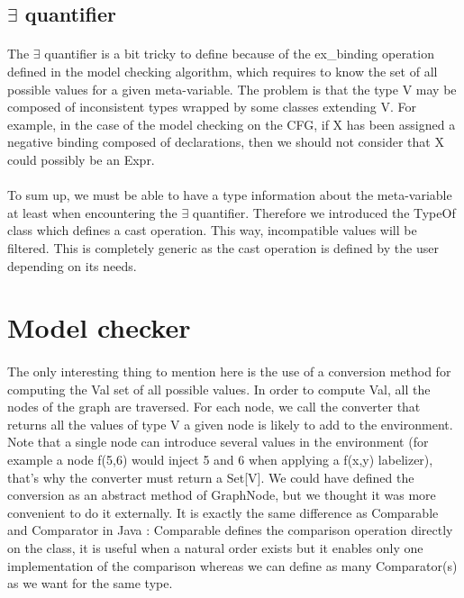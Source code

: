 \documentclass{report}
\begin{document}
\subsection{$\exists$ quantifier}

\paragraph{}
\hspace{4mm}The $\exists$ quantifier is a bit tricky to define because of the ex\_binding operation defined in the model checking algorithm, which requires
to know the set of all possible values for a given meta-variable. The problem is that the type V may be composed of inconsistent types wrapped by some classes extending V. For example, in the case of the model checking on the CFG,
if X has been assigned a negative binding composed of declarations, then we should not consider that X could possibly be an Expr.

\paragraph{}
\hspace{4mm}To sum up, we must be able to have a type information about the meta-variable at least when encountering the $\exists$ quantifier. Therefore
we introduced the TypeOf class which defines a cast operation. This way, incompatible values will be filtered. This is completely generic as the cast operation is defined by the user depending on its needs.

\section{Model checker}

\paragraph{}
\hspace{4mm}The only interesting thing to mention here is the use of a conversion method for computing the Val set of all possible values.
In order to compute Val, all the nodes of the graph are traversed. For each node, we call the converter that returns all the values of type V a given node is likely to add to the environment. Note that 
a single node can introduce several values in the environment (for example a node f(5,6) would inject 5 and 6 when applying a f(x,y) labelizer), that's why the converter must return a Set[V]. We could have defined
the conversion as an abstract method of GraphNode, but we thought it was more convenient to do it externally. It is exactly the same difference as
Comparable and Comparator in Java : Comparable defines the comparison operation directly on the class, it is useful when a natural order exists but it enables only one implementation
of the comparison whereas we can define as many Comparator(s) as we want for the same type.
\end{document}
